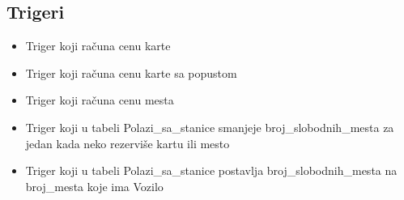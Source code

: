 \documentclass[12pt]{article}
\begin{document}
\subsection{Trigeri}
\begin{itemize}
	\item Triger koji ra\v cuna cenu karte
	\item Triger koji ra\v cuna cenu karte sa popustom
	\item Triger koji ra\v cuna cenu mesta
	\item Triger koji u tabeli Polazi\_sa\_stanice smanjeje broj\_slobodnih\_mesta za jedan kada neko rezervi\v se kartu ili mesto
	\item Triger koji u tabeli Polazi\_sa\_stanice postavlja broj\_slobodnih\_mesta na broj\_mesta koje ima Vozilo
\end{itemize}
\end{document}
